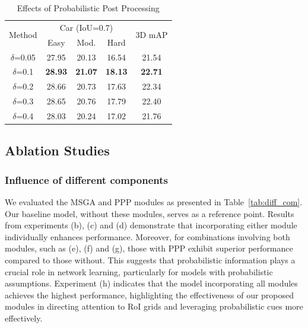 \documentclass[journal]{IEEEtran}
\begin{document}
\begin{table}[]
	\centering
	\caption{Effects of Probabilistic Post Processing}
	\label{tab:ppp module}
{%
	\begin{tabular}{ccccc}
		\hline
		\multirow{2}{*}{{Method}} & \multicolumn{3}{c}{{Car (IoU=0.7)}} & \multirow{2}{*}{3D mAP} \\ \cline{2-4}
		& Easy  & Mod.  & Hard  &       \\ \hline
		$\delta$=0.05 		& {27.95} & {20.13} 		&{16.54} & {21.54}  	\\
		$\delta$=0.1 		& \textbf{28.93} & \textbf{21.07} 		&\textbf{18.13} & \textbf{22.71}  	\\
		$\delta$=0.2 		& 28.66 & 20.73 & 17.63 & 22.34 	\\
		$\delta$=0.3  		& 28.65 & 20.76 & 17.79 & 22.40  	\\
		$\delta$=0.4 		& 28.03 & 20.24 & 17.02 & 21.76  	\\ \hline
	\end{tabular}%
}
\end{table}
	
	\subsection{Ablation Studies}
	\subsubsection{Influence of different components}
	We evaluated the MSGA and PPP modules as presented in Table~\ref{tab:diff_com}. Our baseline model, without these modules, serves as a reference point. Results from experiments (b), (c) and (d) demonstrate that incorporating either module individually enhances performance. Moreover, for combinations involving both modules, such as (e), (f) and (g), those with PPP exhibit superior performance compared to those without. This suggests that probabilistic information plays a crucial role in network learning, particularly for models with probabilistic assumptions. Experiment (h) indicates that the model incorporating all modules achieves the highest performance, highlighting the effectiveness of our proposed modules in directing attention to RoI grids and leveraging probabilistic cues more effectively.
	
	
\end{document}

